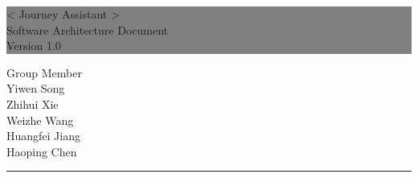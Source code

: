 \documentclass[10pt]{article}
\begin{document}

\begin{titlepage} %
	
	
	\colorbox{grey}{
		\parbox[t]{1.1\textwidth}{ %
			\parbox[t]{1.02\textwidth}{ %
				\raggedleft %
				\fontsize{34pt}{40pt}\selectfont %
				\vspace{0.7cm} %
				
				< Journey Assistant >\\
                Software Architecture Document\\
                Version 1.0\\
				
				\vspace{0.7cm} %
			}
		}
	}
	
	\vfill %
	
	
	\parbox[t]{1\textwidth}{ %
		\raggedleft %
		\large %
		{\Large Group Member}\\[4pt] %
        Yiwen Song\\
        Zhihui Xie\\
        Weizhe Wang\\
        Huangfei Jiang\\
        Haoping Chen\\
		
		\hfill\rule{0.2\linewidth}{1pt}%
    }
    
	
\end{titlepage}
\end{document}
